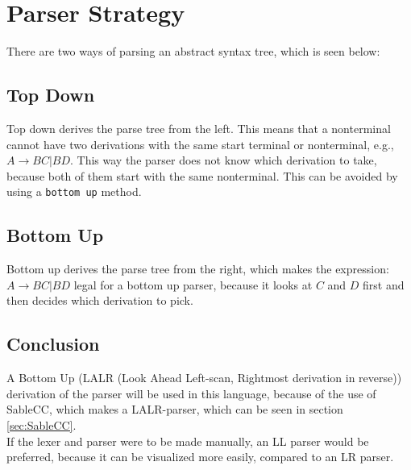 \section{Parser Strategy}
\label{Parserstrategy}
There are two ways of parsing an abstract syntax tree, which is seen below:

\subsection*{Top Down}
Top down derives the parse tree from the left. This means that a nonterminal cannot have two derivations with the same start terminal or nonterminal, e.g., $A \rightarrow BC | BD$. This way the parser does not know which derivation to take, because both of them start with the same nonterminal.
This can be avoided by using a \texttt{bottom up} method.

\subsection*{Bottom Up}
Bottom up derives the parse tree from the right, which makes the expression: $A \rightarrow BC | BD$ legal for a bottom up parser, because it looks at $C$ and $D$ first and then decides which derivation to pick.

\subsection*{Conclusion}
A Bottom Up (LALR (Look Ahead Left-scan, Rightmost derivation in reverse)) derivation of the parser will be used in this language, because of the use of SableCC, which makes a LALR-parser, which can be seen in section \ref{sec:SableCC}. \\
If the lexer and parser were to be made manually, an LL parser would be preferred, because it can be visualized more easily, compared to an LR parser.